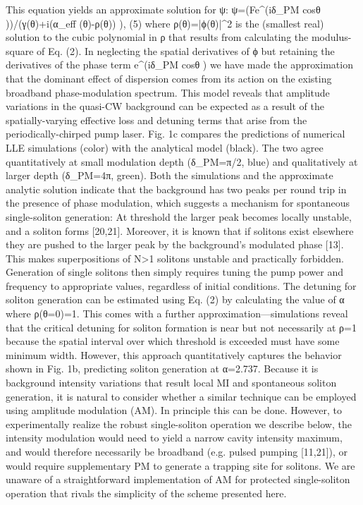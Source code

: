 This equation yields an approximate solution for ψ:
ψ=(Fe^(iδ_PM  cos⁡θ ))/(γ(θ)+i(α_eff (θ)-ρ(θ)) ),	(5)
where ρ(θ)=|ϕ(θ)|^2 is the (smallest real) solution to the cubic polynomial in ρ that results from calculating the modulus-square of Eq. (2). In neglecting the spatial derivatives of ϕ but retaining the derivatives of the phase term e^(iδ_PM  cos⁡θ ) we have made the approximation that the dominant effect of dispersion comes from its action on the existing broadband phase-modulation spectrum. This model reveals that amplitude variations in the quasi-CW background can be expected as a result of the spatially-varying effective loss and detuning terms that arise from the periodically-chirped pump laser.
Fig. 1c compares the predictions of numerical LLE simulations (color) with the analytical model (black). The two agree quantitatively at small modulation depth (δ_PM=π/2, blue) and qualitatively at larger depth (δ_PM=4π, green). Both the simulations and the approximate analytic solution indicate that the background has two peaks per round trip in the presence of phase modulation, which suggests a mechanism for spontaneous single-soliton generation: At threshold the larger peak becomes locally unstable, and a soliton forms [20,21]. Moreover, it is known that if solitons exist elsewhere they are pushed to the larger peak by the background’s modulated phase [13]. This makes superpositions of N>1 solitons unstable and practically forbidden. Generation of single solitons then simply requires tuning the pump power and frequency to appropriate values, regardless of initial conditions. 
The detuning for soliton generation can be estimated using Eq. (2) by calculating the value of α where ρ(θ=0)=1. This comes with a further approximation—simulations reveal that the critical detuning for soliton formation is near but not necessarily at ρ=1 because the spatial interval over which threshold is exceeded must have some minimum width. However, this approach quantitatively captures the behavior shown in Fig. 1b, predicting soliton generation at α=2.737.
Because it is background intensity variations that result local MI and spontaneous soliton generation, it is natural to consider whether a similar technique can be employed using amplitude modulation (AM). In principle this can be done. However, to experimentally realize the robust single-soliton operation we describe below, the intensity modulation would need to yield a narrow cavity intensity maximum, and would therefore necessarily be broadband (e.g. pulsed pumping [11,21]), or would require supplementary PM to generate a trapping site for solitons. We are unaware of a straightforward implementation of AM for protected single-soliton operation that rivals the simplicity of the scheme presented here.
